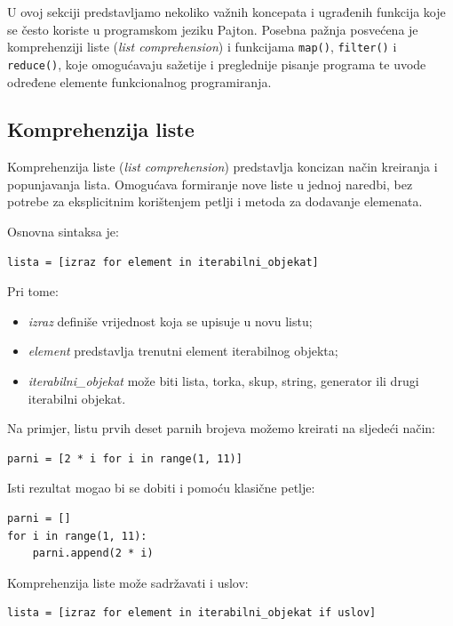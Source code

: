 U ovoj sekciji predstavljamo nekoliko važnih koncepata i ugrađenih funkcija koje se često koriste u programskom jeziku Pajton. Posebna pažnja posvećena je komprehenziji liste (\textit{list comprehension}) i funkcijama \texttt{map()}, \texttt{filter()} i \texttt{reduce()}, koje omogućavaju sažetije i preglednije pisanje programa te uvode određene elemente funkcionalnog programiranja.

\subsection{Komprehenzija liste}

Komprehenzija liste (\textit{list comprehension}) predstavlja koncizan način kreiranja i popunjavanja lista. Omogućava formiranje nove liste u jednoj naredbi, bez potrebe za eksplicitnim korištenjem petlji i metoda za dodavanje elemenata.

Osnovna sintaksa je:

\begin{verbatim}
lista = [izraz for element in iterabilni_objekat]
\end{verbatim}

Pri tome:

\begin{itemize}
	\item \textit{izraz} definiše vrijednost koja se upisuje u novu listu;
	\item \textit{element} predstavlja trenutni element iterabilnog objekta;
	\item \textit{iterabilni\_objekat} može biti lista, torka, skup, string, generator ili drugi iterabilni objekat.
\end{itemize}

Na primjer, listu prvih deset parnih brojeva možemo kreirati na sljedeći način:

\begin{verbatim}
parni = [2 * i for i in range(1, 11)]
\end{verbatim}

Isti rezultat mogao bi se dobiti i pomoću klasične petlje:

\begin{verbatim}
parni = []
for i in range(1, 11):
    parni.append(2 * i)
\end{verbatim}

Komprehenzija liste može sadržavati i uslov:

\begin{verbatim}
lista = [izraz for element in iterabilni_objekat if uslov]
\end{verbatim}

